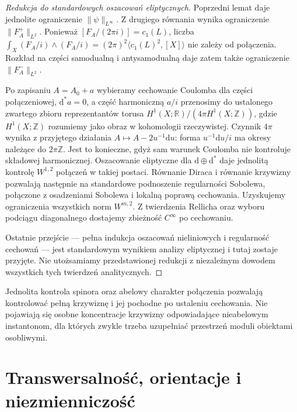 \begin{proof}[Redukcja do standardowych oszacowań eliptycznych]
Poprzedni lemat daje jednolite ograniczenie
$\|\psi\|_{L^\infty}$. Z drugiego równania wynika
ograniczenie $\|F_A^+\|_{L^2}$.
Ponieważ
$[F_A/(2\pi i)]=c_1(L)$, liczba
$\int_X(F_A/i)\wedge(F_A/i)=(2\pi)^2\langle c_1(L)^2,[X]\rangle$
nie zależy od połączenia. Rozkład na części samodualną
i antysamodualną daje zatem także ograniczenie
$\|F_A^-\|_{L^2}$.

Po zapisaniu $A=A_0+a$ wybieramy cechowanie Coulomba
dla części połączeniowej, $\mathrm d^*a=0$, a część harmoniczną $a/i$ przenosimy do
ustalonego zwartego zbioru reprezentantów torusa
$H^1(X;\mathbb R)/(4\pi H^1(X;\mathbb Z))$,
gdzie $H^1(X;\mathbb Z)$ rozumiemy jako obraz w kohomologii
rzeczywistej. Czynnik $4\pi$ wynika z przyjętego działania
$A\mapsto A-2u^{-1}\mathrm du$: forma $u^{-1}\mathrm du/i$
ma okresy należące do $2\pi\mathbb Z$.
Jest to konieczne, gdyż sam warunek Coulomba
nie kontroluje składowej harmonicznej.
Oszacowanie eliptyczne dla $\mathrm d\oplus\mathrm d^*$
daje jednolitą kontrolę $W^{1,2}$ połączeń w takiej postaci.
Równanie Diraca i równanie krzywizny pozwalają następnie
na standardowe podnoszenie regularności Sobolewa,
połączone z osadzeniami Sobolewa i lokalną poprawą cechowania.
Uzyskujemy ograniczenia wszystkich norm $W^{m,2}$.
Z twierdzenia Rellicha oraz wyboru podciągu diagonalnego
dostajemy zbieżność $C^\infty$ po cechowaniu.

Ostatnie przejście --- pełna indukcja oszacowań
nieliniowych i regularność cechowań --- jest standardowym
wynikiem analizy eliptycznej i tutaj zostaje przyjęte.
Nie utożsamiamy przedstawionej redukcji z niezależnym
dowodem wszystkich tych twierdzeń analitycznych.
\end{proof}

\begin{uwaga}
Jednolita kontrola spinora oraz abelowy charakter
połączenia pozwalają kontrolować pełną krzywiznę
i jej pochodne po ustaleniu cechowania. Nie pojawiają
się osobne koncentracje krzywizny odpowiadające
nieabelowym instantonom, dla których zwykle trzeba
uzupełniać przestrzeń moduli obiektami osobliwymi.
\end{uwaga}

\section{Transwersalność, orientacje i niezmienniczość}
\label{sec:tg-sw-transversality}

